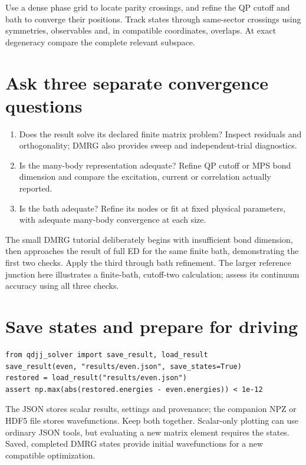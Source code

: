 Use a dense phase grid to locate parity crossings, and refine the QP cutoff and
bath to converge their positions. Track states through same-sector crossings
using symmetries, observables and, in compatible coordinates, overlaps.
At exact degeneracy compare the complete relevant subspace.

\section{Ask three separate convergence questions}

\begin{enumerate}
\item Does the result solve its declared finite matrix problem? Inspect residuals
and orthogonality; DMRG also provides sweep and independent-trial diagnostics.
\item Is the many-body representation adequate? Refine QP cutoff or MPS bond
dimension and compare the excitation, current or correlation actually reported.
\item Is the bath adequate? Refine its nodes or fit at fixed physical parameters,
with adequate many-body convergence at each size.
\end{enumerate}
The small DMRG tutorial deliberately begins with insufficient bond dimension,
then approaches the result of full ED for the same finite bath, demonstrating
the first two checks. Apply the third through bath refinement. The larger
reference junction here illustrates a finite-bath, cutoff-two calculation;
assess its continuum accuracy using all three checks.


\section{Save states and prepare for driving}

\begin{lstlisting}
from qdjj_solver import save_result, load_result
save_result(even, "results/even.json", save_states=True)
restored = load_result("results/even.json")
assert np.max(abs(restored.energies - even.energies)) < 1e-12
\end{lstlisting}

The JSON stores scalar results, settings and provenance; the companion NPZ or
HDF5 file stores wavefunctions. Keep both together. Scalar-only plotting can use
ordinary JSON tools, but evaluating a new matrix element requires the states.
Saved, completed DMRG states provide initial wavefunctions for a new compatible
optimization.

